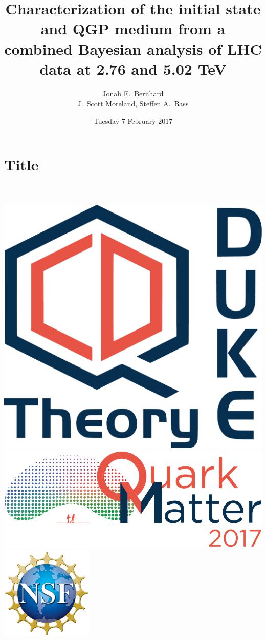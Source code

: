 \documentclass{beamer}
\title[Bayesian characterization of the initial state and QGP medium]{
  Characterization of the initial state and QGP medium from a combined Bayesian analysis of LHC data at 2.76 and 5.02 TeV
}
\author[J.\ E.\ Bernhard]{Jonah E.\ Bernhard \\ J.\ Scott Moreland, Steffen A.\ Bass}
\institute[Duke U.]{Duke University}
\date{Tuesday 7 February 2017}
\begin{document}
\section{Title}

\begin{frame}
  \rm{}
  \centering
  \vspace{.15\textheight}
  {\color{theme}\Large\inserttitle} \\[.05\textheight]
  \insertauthor \\[.1\textheight]
  \includegraphics[height=.1\textheight]{logos/dukeqcd}
  \hspace{.08\textwidth}
  \includegraphics[height=.1\textheight]{logos/qm2017}
  \hspace{.08\textwidth}
  \includegraphics[height=.1\textheight]{logos/nsf}
\end{frame}
\end{document}
